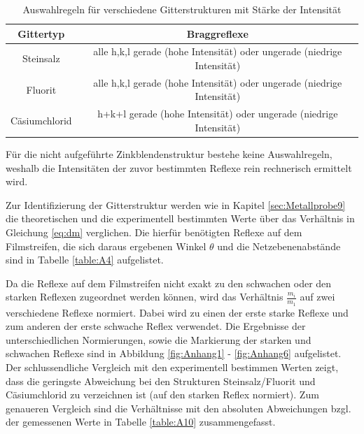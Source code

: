   \begin{table}
     \centering
     \caption{Auswahlregeln für verschiedene Gitterstrukturen mit Stärke der Intensität}
     \label{tbl:beispieltabelle}
     \begin{tabular}{cc}
       \hline
       \textbf{Gittertyp}  & \textbf{Braggreflexe} \\
       \hline
       Steinsalz           & alle h,k,l gerade (hohe Intensität) oder ungerade (niedrige Intensität)             \\
       Fluorit             & alle h,k,l gerade (hohe Intensität) oder ungerade (niedrige Intensität)              \\
       Cäsiumchlorid       & h\:+\:k\:+\:l gerade (hohe Intensität) oder ungerade (niedrige Intensität)              \\
     \end{tabular}



   \end{table}

Für die nicht aufgeführte Zinkblendenstruktur bestehe keine Auswahlregeln, weshalb die Intensitäten der zuvor bestimmten Reflexe rein rechnerisch ermittelt wird.




Zur Identifizierung der Gitterstruktur werden wie in Kapitel \ref{sec:Metallprobe9} die theoretischen und die experimentell bestimmten Werte über das Verhältnis in Gleichung \ref{eq:dm} verglichen. Die hierfür benötigten Reflexe auf dem Filmstreifen, die sich daraus ergebenen Winkel $\theta$ und die Netzebenenabstände sind in Tabelle \ref{table:A4} aufgelistet.



Da die Reflexe auf dem Filmstreifen nicht exakt zu den schwachen oder den starken Reflexen zugeordnet werden können, wird das Verhältnis $\frac{m_i}{m_1}$ auf zwei verschiedene Reflexe normiert. Dabei wird zu einen der erste starke Reflexe und zum anderen der erste schwache Reflex verwendet. Die Ergebnisse der unterschiedlichen Normierungen, sowie die Markierung der starken und schwachen Reflexe sind in Abbildung \ref{fig:Anhang1} - \ref{fig:Anhang6} aufgelistet. Der schlussendliche Vergleich mit den experimentell bestimmen Werten zeigt, dass die geringste Abweichung bei den Strukturen Steinsalz/Fluorit und Cäsiumchlorid zu verzeichnen ist (auf den starken Reflex normiert). Zum genaueren Vergleich sind die Verhältnisse mit den absoluten Abweichungen bzgl. der gemessenen Werte in Tabelle \ref{table:A10} zusammengefasst.


